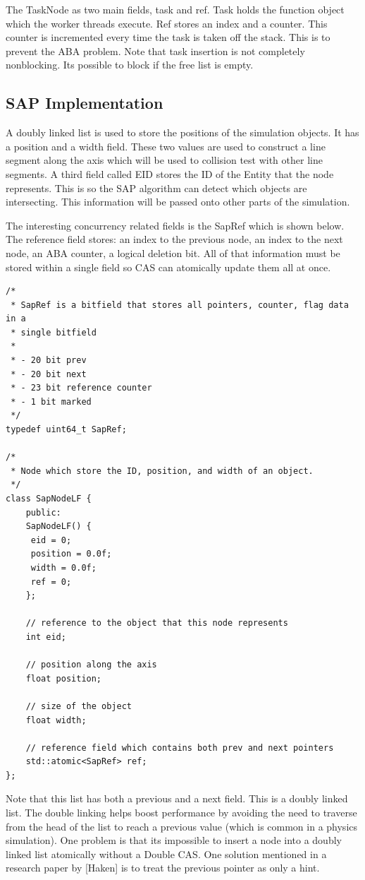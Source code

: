 \documentclass[conference]{IEEEtran}
\begin{document}
The TaskNode as two main fields, task and ref. Task holds the function object which the worker threads execute. Ref stores an index and a counter. This counter is incremented every time the task is taken off the stack. This is to prevent the ABA problem. Note that task insertion is not completely nonblocking. It\textquotesingle s possible to block if the free list is empty.

	\subsection{SAP Implementation}
	A doubly linked list is used to store the positions of the simulation objects. It has a position and a width field. These two values are used to construct a line segment along the axis which will be used to collision test with other line segments. A third field called EID stores the ID of the Entity that the node represents. This is so the SAP algorithm can detect which objects are intersecting. This information will be passed onto other parts of the simulation.


The interesting concurrency related fields is the SapRef which is shown below. The reference field stores: an index to the previous node, an index to the next node, an ABA counter, a logical deletion bit. All of that information must be stored within a single field so CAS can atomically update them all at once.

\begin{lstlisting}
/*
 * SapRef is a bitfield that stores all pointers, counter, flag data in a
 * single bitfield
 *
 * - 20 bit prev
 * - 20 bit next
 * - 23 bit reference counter
 * - 1 bit marked
 */
typedef uint64_t SapRef;

/*
 * Node which store the ID, position, and width of an object.
 */
class SapNodeLF {
    public:
    SapNodeLF() {
   	 eid = 0;
   	 position = 0.0f;
   	 width = 0.0f;
   	 ref = 0;
    };

    // reference to the object that this node represents
    int eid;

    // position along the axis
    float position;

    // size of the object
    float width;

    // reference field which contains both prev and next pointers
    std::atomic<SapRef> ref;
};

\end{lstlisting}

Note that this list has both a previous and a next field. This is a doubly linked list. The double linking helps boost performance by avoiding the need to traverse from the head of the list to reach a previous value (which is common in a physics simulation). One problem is that it\textquotesingle s impossible to insert a node into a doubly linked list atomically without a Double CAS. One solution mentioned in a research paper by [Haken] is to treat the previous pointer as only a hint.\\
\end{document}
